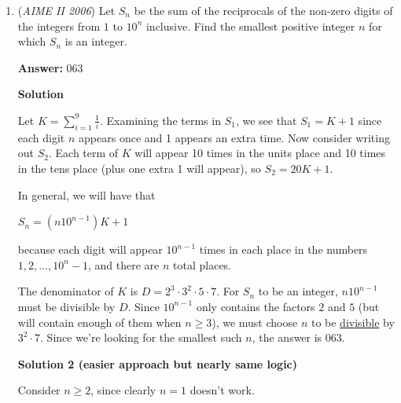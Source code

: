 \begin{enumerate}
 If $p-q$ is even, then $(p+q)(p-q)$ must have at least two factors of $2$, so we can rewrite the expression as $4(k)(k-q)$ where $k=\frac{p+q}{2}$. We can disregard the $4$ by dividing by $4$ and restricting our upper bound to $250$. Since $k$ and $q$ don't have to be the same parity, we can include all cases less than 250 that have 9 or 10 factors. We then have 
 \[(2^2\cdot3^2),(2^2\cdot5^2),(2^2\cdot7^2), (3^2\cdot5^2), (2^4\cdot3), (2^4\cdot5), (2^4\cdot7), (2^4\cdot11), (2^4\cdot13), (3^4\cdot2)\]as the possibilities. 

 Therefore, there are $10+5=\boxed{015}$ possibilities for $p^2-q^2=N$ ~sigma

 


	\item (\textit{AIME II 2006}) Let $S_n$ be the sum of the reciprocals of the non-zero digits of the integers from $1$ to $10^n$ inclusive. Find the smallest positive integer $n$ for which $S_n$ is an integer.


 
 \textbf{Answer: }063



\textbf{Solution}

Let $K = \sum_{i=1}^{9}{\frac{1}{i}}$.  Examining the terms in $S_1$, we see that $S_1 = K + 1$ since each digit $n$ appears once and 1 appears an extra time.  Now consider writing out $S_2$.  Each term of $K$ will appear 10 times in the units place and 10 times in the tens place (plus one extra 1 will appear), so $S_2 = 20K + 1$.

 In general, we will have that

 $S_n = (n10^{n-1})K + 1$

 because each digit will appear $10^{n - 1}$ times in each place in the numbers $1, 2, \ldots, 10^{n} - 1$, and there are $n$ total places.  

 The denominator of $K$ is $D = 2^3\cdot 3^2\cdot 5\cdot 7$.  For $S_n$ to be an integer, $n10^{n-1}$ must be divisible by $D$.  Since $10^{n-1}$ only contains the factors $2$ and $5$ (but will contain enough of them when $n \geq 3$), we must choose $n$ to be \href{https://artofproblemsolving.com/wiki/index.php?title=Divisible}{divisible} by $3^2\cdot 7$.  Since we're looking for the smallest such $n$, the answer is $\boxed{063}$.

 



\textbf{Solution 2 (easier approach but nearly same logic)}

Consider \( n \ge 2 \), since clearly \( n = 1 \) doesn't work.


\end{enumerate}
